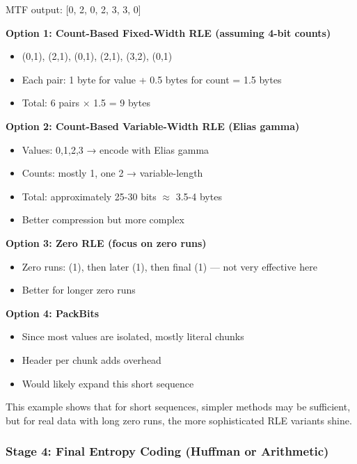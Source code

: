 \begin{examplebox}

MTF output: [0, 2, 0, 2, 3, 3, 0]

\textbf{Option 1: Count-Based Fixed-Width RLE (assuming 4-bit counts)}
\begin{itemize}
    \item (0,1), (2,1), (0,1), (2,1), (3,2), (0,1)
    \item Each pair: 1 byte for value + 0.5 bytes for count = 1.5 bytes
    \item Total: 6 pairs × 1.5 = 9 bytes
\end{itemize}

\textbf{Option 2: Count-Based Variable-Width RLE (Elias gamma)}
\begin{itemize}
    \item Values: 0,1,2,3 → encode with Elias gamma
    \item Counts: mostly 1, one 2 → variable-length
    \item Total: approximately 25-30 bits $\approx$ 3.5-4 bytes
    \item Better compression but more complex
\end{itemize}

\textbf{Option 3: Zero RLE (focus on zero runs)}
\begin{itemize}
    \item Zero runs: (1), then later (1), then final (1) — not very effective here
    \item Better for longer zero runs
\end{itemize}

\textbf{Option 4: PackBits}
\begin{itemize}
    \item Since most values are isolated, mostly literal chunks
    \item Header per chunk adds overhead
    \item Would likely expand this short sequence
\end{itemize}

This example shows that for short sequences, simpler methods may be sufficient, but for real data with long zero runs, the more sophisticated RLE variants shine.
\end{examplebox}

\subsubsection{Stage 4: Final Entropy Coding (Huffman or Arithmetic)}

